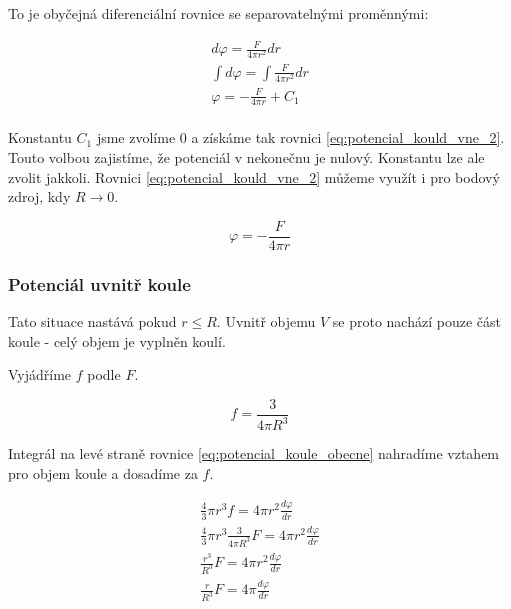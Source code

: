 \documentclass{book}
\begin{document}
To je obyčejná diferenciální rovnice se separovatelnými proměnnými:

\begin{equation}
\label{eq:potencial_koule_vne_1}
\begin{split}
d \varphi = \frac{F}{4 \pi r^2} dr \\
\int d \varphi = \int \frac{F}{4 \pi r^2} dr \\
\varphi = -\frac{F}{4 \pi r} + C_1 \\
\end{split}
\end{equation}

Konstantu \(C_1\) jsme zvolíme 0 a získáme tak rovnici \eqref{eq:potencial_kould_vne_2}. Touto volbou zajistíme, že potenciál v nekonečnu je nulový. Konstantu lze ale zvolit jakkoli. Rovnici \eqref{eq:potencial_kould_vne_2} můžeme využít i pro bodový zdroj, kdy \(R \rightarrow 0\).

\begin{equation}
\label{eq:potencial_koule_vne_2}
\varphi = -\frac{F}{4 \pi r}
\end{equation}

\subsubsection{Potenciál uvnitř koule}

Tato situace nastává pokud \(r \leq R\). Uvnitř objemu \(V\) se proto nachází pouze část koule - celý objem je vyplněn koulí.

Vyjádříme \(f\) podle \(F\).

\begin{equation}
f = \frac{3}{4 \pi R^3}
\end{equation}

Integrál na levé straně rovnice \eqref{eq:potencial_koule_obecne} nahradíme vztahem pro objem koule a dosadíme za \(f\).

\begin{equation}
\begin{split}
\frac{4}{3} \pi r^3 f = 4 \pi r^2 \frac{d \varphi}{dr} \\
\frac{4}{3} \pi r^3 \frac{3}{4 \pi R^3} F = 4 \pi r^2 \frac{d \varphi}{dr} \\
\frac{r^3}{R^3} F = 4 \pi r^2 \frac{d \varphi}{dr} \\
\frac{r}{R^3} F = 4 \pi \frac{d \varphi}{dr}
\end{split}
\end{equation}
\end{document}
